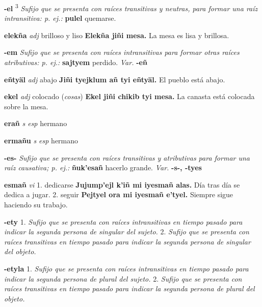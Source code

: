 \documentclass[10pt]{scrbook}
\newcommand{\entry}[1]{\textbf{#1}}
\newcommand{\onedefinition}[1]{#1.}
\newcommand{\defsuperscript}[1]{\textsuperscript{#1}}
\newcommand{\nontranslationdef}[1]{\textit{#1}}
\newcommand{\partofspeech}[1]{\textit{#1}}
\newcommand{\spanishtranslation}[1]{#1}
\newcommand{\clarification}[1]{(\textit{#1})}
\newcommand{\cholexample}[1]{\textbf{#1}}
\newcommand{\exampletranslation}[1]{#1}
\newcommand{\variation}[1]{\textit{Var.} \textbf{#1}}
\begin{document}
\begin{multicols}{2}
\entry{-el}
\defsuperscript{3}
\nontranslationdef{Sufijo que se presenta con raíces transitivas y neutras, para formar una raíz intransitiva: p. ej.:}
\cholexample{pulel}
\exampletranslation{quemarse.}

\entry{elekña}
\partofspeech{adj}
\spanishtranslation{brilloso y liso}
\cholexample{Elekña jiñi mesa.}
\exampletranslation{La mesa es lisa y brillosa.}

\entry{-em}
\nontranslationdef{Sufijo que se presenta con raíces intransitivas para formar otras raíces atributivas: p. ej.:}
\cholexample{sajtyem}
\exampletranslation{perdido.}
\variation{-eñ}

\entry{eñtyäl}
\partofspeech{adj}
\spanishtranslation{abajo}
\cholexample{Jiñi tyejklum añ tyi eñtyäl.}
\exampletranslation{El pueblo está abajo.}

\entry{ekel}
\partofspeech{adj}
\spanishtranslation{colocado}
\clarification{cosas}
\cholexample{Ekel jiñi chikib tyi mesa.}
\exampletranslation{La canasta está colocada sobre la mesa.}

\entry{erañ}
\partofspeech{s esp}
\spanishtranslation{hermano}

\entry{ermañu}
\partofspeech{s esp}
\spanishtranslation{hermano}

\entry{-es-}
\nontranslationdef{Sufijo que se presenta con raíces transitivas y atributivas para formar una raíz causativa; p. ej.:}
\cholexample{ñuk'esañ}
\exampletranslation{hacerlo grande.}
\variation{-s-, -tyes}

\entry{esmañ}
\partofspeech{vi}
\onedefinition{1}
\spanishtranslation{dedicarse}
\cholexample{Jujump'ejl k'iñ mi iyesmañ alas.}
\exampletranslation{Día tras día se dedica a jugar.}
\onedefinition{2}
\spanishtranslation{seguir}
\cholexample{Pejtyel ora mi iyesmañ e'tyel.}
\exampletranslation{Siempre sigue haciendo su trabajo.}

\entry{-ety}
\onedefinition{1}
\nontranslationdef{Sufijo que se presenta con raíces intransitivas en tiempo pasado para indicar la segunda persona de singular del sujeto.}
\onedefinition{2}
\nontranslationdef{Sufijo que se presenta con raíces transitivas en tiempo pasado para indicar la segunda persona de singular del objeto.}

\entry{-etyla}
\onedefinition{1}
\nontranslationdef{Sufijo que se presenta con raíces intransitivas en tiempo pasado para indicar la segunda persona de plural del sujeto.}
\onedefinition{2}
\nontranslationdef{Sufijo que se presenta con raíces transitivas en tiempo pasado para indicar la segunda persona de plural del objeto.}


\end{multicols}
\end{document}
